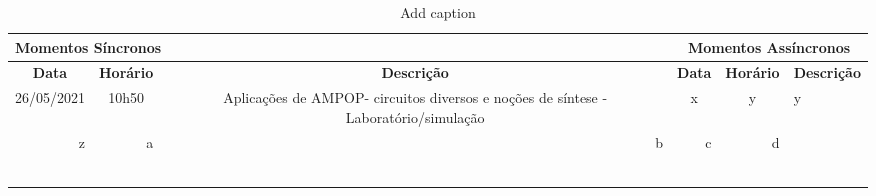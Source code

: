 \documentclass[12pt, a4paper, oneside]{book}
\begin{document}
\begin{table}[htbp]
	\centering
	\caption{Add caption}
	\begin{tabular}{p{2.285em}ccccc}
		\hline
		\multicolumn{3}{p{11.07em}|}{\textbf{Momentos Síncronos }} &
		\multicolumn{3}{c}{\textbf{Momentos Assíncronos}}
		\bigstrut\\
		\hline
		\multicolumn{1}{c|}{\textbf{Data}} &
		\multicolumn{1}{c|}{\textbf{Horário }} &
		\multicolumn{1}{c|}{\textbf{Descrição}} &
		\multicolumn{1}{c|}{\textbf{Data}} &
		\multicolumn{1}{c|}{\textbf{Horário }} &
		\textbf{Descrição}
		\bigstrut\\
		\hline
		\multicolumn{1}{c|}{26/05/2021} &
		\multicolumn{1}{c|}{10h50} &
		\multicolumn{1}{p{11.07em}|}{Aplicações de AMPOP- circuitos diversos e noções de síntese - Laboratório/simulação} &
		\multicolumn{1}{c|}{x} &
		\multicolumn{1}{c|}{y} &
		\multicolumn{1}{l}{y} \\
		\hline
		\multicolumn{1}{r|}{z} &
		\multicolumn{1}{r|}{a} &
		\multicolumn{1}{r|}{b} &
		\multicolumn{1}{r|}{c} &
		\multicolumn{1}{r|}{d} &
		
		\bigstrut\\
		\hline
		\multicolumn{1}{r|}{} &
		\multicolumn{1}{r|}{} &
		\multicolumn{1}{r|}{} &
		\multicolumn{1}{r|}{} &
		\multicolumn{1}{r|}{} &
		
		\bigstrut\\
		\hline
		\multicolumn{1}{r|}{} &
		\multicolumn{1}{r|}{} &
		\multicolumn{1}{r|}{} &
		\multicolumn{1}{r|}{} &
		\multicolumn{1}{r|}{} &
		
		\bigstrut\\
		\hline
		\multicolumn{1}{r|}{} &
		\multicolumn{1}{r|}{} &
		\multicolumn{1}{r|}{} &
		\multicolumn{1}{r|}{} &
		\multicolumn{1}{r|}{} &
		
		\bigstrut\\
		\hline
		\multicolumn{1}{r|}{} &
		\multicolumn{1}{r|}{} &
		\multicolumn{1}{r|}{} &
		\multicolumn{1}{r|}{} &
		\multicolumn{1}{r|}{} &
		
		\bigstrut\\
		\hline
		\multicolumn{1}{r|}{} &
		\multicolumn{1}{r|}{} &
		\multicolumn{1}{r|}{} &
		\multicolumn{1}{r|}{} &
		\multicolumn{1}{r|}{} &
		
		\bigstrut\\
		\hline
		\multicolumn{1}{r|}{} &
		\multicolumn{1}{r|}{} &
		\multicolumn{1}{r|}{} &
		\multicolumn{1}{r|}{} &
		\multicolumn{1}{r|}{} &
		

\end{tabular}
\end{table}
\end{document}
